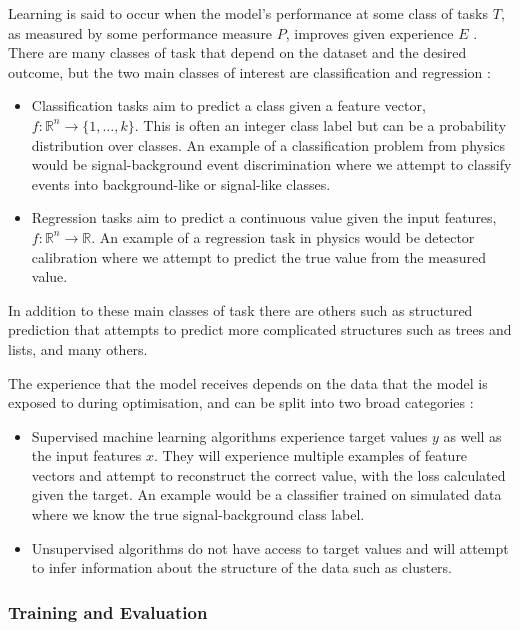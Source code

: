 Learning is said to occur when the model's performance at some class of tasks $T$, as measured by some performance measure $P$, improves given experience $E$ \cite{Learning}.
There are many classes of task that depend on the dataset and the desired outcome, but the two main classes of interest are classification and regression \cite{DeepLearningBook}:
\begin{itemize}[noitemsep]
    \item Classification tasks aim to predict a class given a feature vector, $f:\mathds{R}^{n}\rightarrow{}\{1,\dots,k\}$.
This is often an integer class label but can be a probability distribution over classes. An example of a classification problem from physics would be signal-background event discrimination where we attempt to classify events into background-like or signal-like classes.
    \item Regression tasks aim to predict a continuous value given the input features, $f:\mathds{R}^{n}\rightarrow\mathds{R}$. An example of a regression task in physics would be detector calibration where we attempt to predict the true value from the measured value. 
\end{itemize}
In addition to these main classes of task there are others such as structured prediction that attempts to predict more complicated structures such as trees and lists, and many others. 


The experience that the model receives depends on the data that the model is exposed to during optimisation, and can be split into two broad categories \cite{DeepLearningBook}:
\begin{itemize}[noitemsep]
    \item Supervised machine learning algorithms experience target values $y$ as well as the input features $x$. They will experience multiple examples of feature vectors and attempt to reconstruct the correct value, with the loss calculated given the target. An example would be a classifier trained on simulated data where we know the true signal-background class label. 
    \item Unsupervised algorithms do not have access to target values and will attempt to infer information about the structure of the data such as clusters.
\end{itemize}



\subsubsection{Training and Evaluation}


